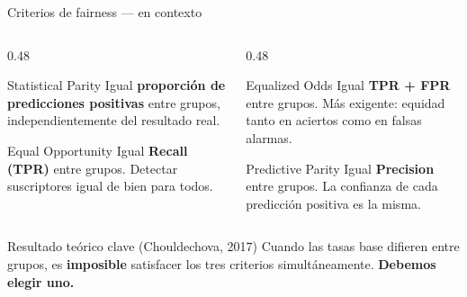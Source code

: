\documentclass[aspectratio=169, 11pt]{beamer}
\begin{document}
\begin{frame}{Criterios de fairness — en contexto}
\begin{columns}[T]
\begin{column}{0.48\textwidth}
\begin{block}{Statistical Parity}
Igual \textbf{proporción de predicciones positivas} entre grupos, independientemente del resultado real.
\end{block}
\vspace{4pt}
\begin{block}{Equal Opportunity}
Igual \textbf{Recall (TPR)} entre grupos. Detectar suscriptores igual de bien para todos.
\end{block}
\end{column}
\begin{column}{0.48\textwidth}
\begin{block}{Equalized Odds}
Igual \textbf{TPR + FPR} entre grupos. Más exigente: equidad tanto en aciertos como en falsas alarmas.
\end{block}
\vspace{4pt}
\begin{block}{Predictive Parity}
Igual \textbf{Precision} entre grupos. La confianza de cada predicción positiva es la misma.
\end{block}
\end{column}
\end{columns}
\vspace{8pt}
\begin{alertblock}{\faExclamationCircle\quad Resultado teórico clave (Chouldechova, 2017)}
Cuando las tasas base difieren entre grupos, es \textbf{imposible} satisfacer los tres criterios simultáneamente. \textbf{Debemos elegir uno.}
\end{alertblock}
\end{frame}
\end{document}
